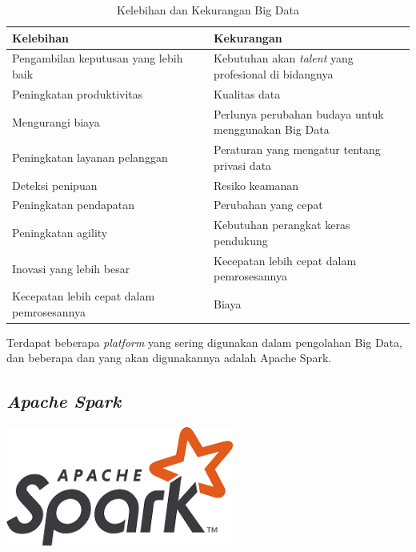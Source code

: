\documentclass[12pt,a4paper]{report}
\begin{document}
	\begin{table}[htb]
		\centering
		\caption{Kelebihan dan Kekurangan Big Data \cite{Harvey2018}}
		\begin{tabular}{|P{0.5\linewidth} | P{0.5\linewidth}|}
			\hline
			\textbf{Kelebihan} & \textbf{Kekurangan} \\ \hline
			Pengambilan keputusan yang lebih baik & Kebutuhan akan \textit{talent} yang profesional di bidangnya \\ \hline
			Peningkatan produktivitas & Kualitas data \\ \hline
			Mengurangi biaya & Perlunya perubahan budaya untuk menggunakan Big Data \\ \hline
			Peningkatan layanan pelanggan & Peraturan yang mengatur tentang privasi data \\ \hline
			Deteksi penipuan & Resiko keamanan \\ \hline
			Peningkatan pendapatan & Perubahan yang cepat \\ \hline
			Peningkatan agility & Kebutuhan perangkat keras pendukung \\ \hline
			Inovasi yang lebih besar & Kecepatan lebih cepat dalam pemrosesannya  \\ \hline
			Kecepatan lebih cepat dalam pemrosesannya & Biaya\\ \hline
		\end{tabular}
	\end{table}

	Terdapat beberapa \textit{platform} yang sering digunakan dalam pengolahan Big Data, dan beberapa dan yang akan digunakannya adalah Apache Spark.
	
	\subsection{\textit{Apache Spark}}
	\begin{center}
		\includegraphics[width=7.5cm]{gambar/spark.png}
	\end{center}
	
\end{document}
